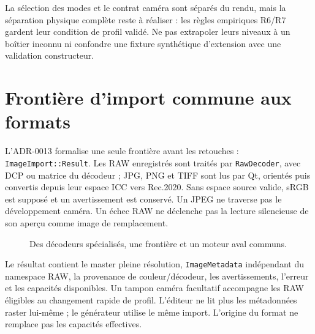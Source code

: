 La sélection des modes et le contrat caméra sont séparés du rendu, mais la
séparation physique complète reste à réaliser : les règles empiriques R6/R7 gardent leur condition
de profil validé. Ne pas extrapoler leurs niveaux à un boîtier inconnu ni
confondre une fixture synthétique d'extension avec une validation constructeur.

\section{Frontière d'import commune aux formats}

L'ADR-0013 formalise une seule frontière avant les retouches :
\texttt{ImageImport::Result}. Les RAW enregistrés sont traités par
\texttt{RawDecoder}, avec DCP ou matrice du décodeur ; JPG, PNG et TIFF sont
lus par Qt, orientés puis convertis depuis leur espace ICC vers Rec.2020.
Sans espace source valide, sRGB est supposé et un avertissement est conservé.
Un JPEG ne traverse pas le développement caméra. Un échec RAW ne déclenche
pas la lecture silencieuse de son aperçu comme image de remplacement.

\begin{figure}[htbp]
\centering
{}
\caption{Des décodeurs spécialisés, une frontière et un moteur aval communs.}
\end{figure}

Le résultat contient le master pleine résolution, \texttt{ImageMetadata}
indépendant du namespace RAW, la provenance de couleur/décodeur, les
avertissements, l'erreur et les capacités disponibles. Un tampon caméra
facultatif accompagne les RAW éligibles au changement rapide de profil.
L'éditeur ne lit plus les métadonnées raster lui-même ; le générateur utilise
le même import. L'origine du format ne remplace pas les capacités effectives.

